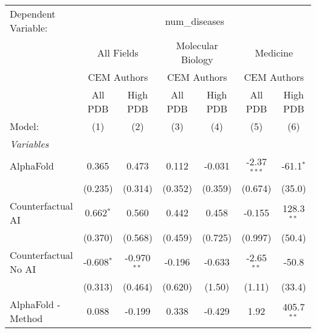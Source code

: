 \begingroup
\centering
\begin{tabular}{lcccccc}
   \tabularnewline \midrule \midrule
   Dependent Variable: & \multicolumn{6}{c}{num\_diseases}\\
 & \multicolumn{2}{c}{All Fields} & \multicolumn{2}{c}{Molecular Biology} & \multicolumn{2}{c}{Medicine} \\
\cmidrule(lr){2-3} \cmidrule(lr){4-5} \cmidrule(lr){6-7}
 & \multicolumn{2}{c}{CEM Authors} & \multicolumn{2}{c}{CEM Authors} & \multicolumn{2}{c}{CEM Authors} \\
\cmidrule(lr){2-3} \cmidrule(lr){4-5} \cmidrule(lr){6-7}
 & \multicolumn{1}{c}{All PDB} & \multicolumn{1}{c}{High PDB} & \multicolumn{1}{c}{All PDB} & \multicolumn{1}{c}{High PDB} & \multicolumn{1}{c}{All PDB} & \multicolumn{1}{c}{High PDB} \\
\cmidrule(lr){2-2} \cmidrule(lr){3-3} \cmidrule(lr){4-4} \cmidrule(lr){5-5} \cmidrule(lr){6-6} \cmidrule(lr){7-7}
   Model:                                                     & (1)          & (2)           & (3)          & (4)           & (5)           & (6)\\  
   \midrule
   \emph{Variables}\\
   AlphaFold                                                  & 0.365        & 0.473         & 0.112        & -0.031        & -2.37$^{***}$ & -61.1$^{*}$\\   
                                                              & (0.235)      & (0.314)       & (0.352)      & (0.359)       & (0.674)       & (35.0)\\   
   Counterfactual AI                                          & 0.662$^{*}$  & 0.560         & 0.442        & 0.458         & -0.155        & 128.3$^{**}$\\   
                                                              & (0.370)      & (0.568)       & (0.459)      & (0.725)       & (0.997)       & (50.4)\\   
   Counterfactual No AI                                       & -0.608$^{*}$ & -0.970$^{**}$ & -0.196       & -0.633        & -2.65$^{**}$  & -50.8\\   
                                                              & (0.313)      & (0.464)       & (0.620)      & (1.50)        & (1.11)        & (33.4)\\   
   AlphaFold - Method                                         & 0.088        & -0.199        & 0.338        & -0.429        & 1.92          & 405.7$^{**}$\\   

\end{tabular}
